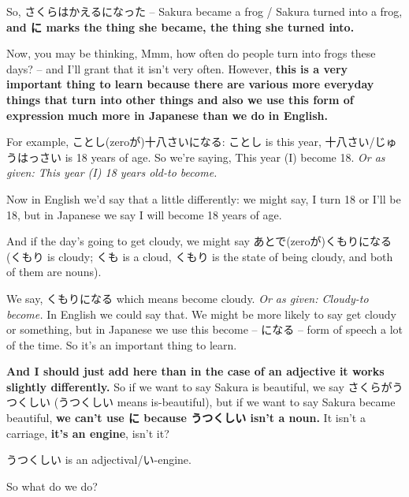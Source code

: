 {}

So, さくらはかえるになった -- Sakura became a frog / Sakura turned into a frog, {\bf and に marks the thing she became, the thing she turned into.}

Now, you may be thinking, Mmm, how often do people turn into frogs these days? -- and I'll grant that it isn't very often. However, {\bf this is a very important thing to learn because there are various more everyday things that turn into other things and also we use this form of expression much more in Japanese than we do in English.}

\thinrule

For example, ことし(zeroが)十八さいになる: ことし is this year, 十八さい/じゅうはっさい is 18 years of age. So we're saying, This year (I) become 18. {\em Or as given: This year (I) 18 years old-to become.}

{}

Now in English we'd say that a little differently: we might say, I turn 18 or I'll be 18, but in Japanese we say I will become 18 years of age.

And if the day's going to get cloudy, we might say あとで(zeroが)くもりになる (くもり is cloudy; くも is a cloud, くもり is the state of being cloudy, and both of them are nouns).

{}

We say, くもりになる which means become cloudy. {\em Or as given: Cloudy-to become.} In English we could say that. We might be more likely to say get cloudy or something, but in Japanese we use this become -- になる -- form of speech a lot of the time. So it's an important thing to learn.

\stopsectionlevel

\startsectionlevel[title={に in the case of adjectives (aka using them as adverbs)},reference={に-in-the-case-of-adjectives-aka-using-them-as-adverbs}]

{\bf And I should just add here than in the case of an adjective it works slightly differently.} So if we want to say Sakura is beautiful, we say さくらがうつくしい (うつくしい means is-beautiful), but if we want to say Sakura became beautiful, {\bf we can't use に because うつくしい isn't a noun.} It isn't a carriage, {\bf it's an engine}, isn't it?

うつくしい is an adjectival/い-engine.

So what do we do?

